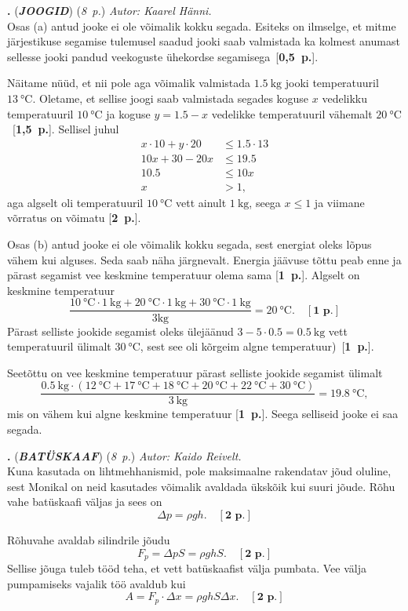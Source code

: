 \documentclass[12pt,a5paper]{article}
\newcommand{\numb}[1]{\textbf{\large #1}}
\newcommand{\nimi}[1]{(\textsl{\small #1})}
\newcommand{\punktid}[1]{(\emph{#1~p.})}
\newcounter{ylesanne}
\newcommand{\yl}[1]{\addtocounter{ylesanne}{1}\newpage\numb{\theylesanne.} \nimi{\textbf{#1}} \newblock{}}
\newcommand{\pp}[1]{[\textbf{#1~p.}]}
\newcommand{\autor}[1]{\emph{ Autor: #1.\\}}
\begin{document}
\yl{JOOGID}\punktid{8}\autor{Kaarel Hänni}
Osas (a) antud jooke ei ole võimalik kokku segada. Esiteks on ilmselge, et mitme järjestikuse segamise tulemusel saadud jooki saab valmistada ka kolmest anumast sellesse jooki pandud veekoguste ühekordse segamisega~\pp{0,5}.\par
Näitame nüüd, et nii pole aga võimalik valmistada $\SI{1.5}{\kilo\gram}$ jooki temperatuuril $\SI{13}{\celsius}$. Oletame, et sellise joogi saab valmistada segades koguse $x$ vedelikku temperatuuril $\SI{10}{\celsius}$ ja koguse $y=\num{1.5}-x$ vedelikke temperatuuril vähemalt $\SI{20}{\celsius}$~\pp{1,5}. Sellisel juhul
\begin{align*}
x\cdot 10+y\cdot 20 &\leq 1.5\cdot 13 \\
10x+30-20x &\leq 19.5 \\
10.5 &\leq 10 x \\
x &> 1,
\end{align*}
aga algselt oli temperatuuril $\SI{10}{\celsius}$ vett ainult $\SI{1}{\kilo\gram}$, seega $x\leq 1$ ja viimane võrratus on võimatu \pp2.

Osas (b) antud jooke ei ole võimalik kokku segada, sest energiat oleks lõpus vähem kui alguses. Seda saab näha järgnevalt. Energia jäävuse tõttu peab enne ja pärast segamist vee keskmine temperatuur olema sama \pp{1}. Algselt on keskmine temperatuur $$\frac{\SI{10}{\celsius} \cdot \SI{1}{\kg} +\SI{20}{\celsius} \cdot \SI{1}{\kg}+\SI{30}{\celsius} \cdot \SI{1}{\kg}}{3\text{kg}}=\SI{20}{\celsius}.  \quad \pp{1}$$
Pärast selliste jookide segamist oleks ülejäänud $3-5\cdot 0.5=\SI{0.5}{\kilo\gram}$ vett temperatuuril ülimalt $\SI{30}{\celsius}$, sest see oli kõrgeim algne temperatuur)~\pp{1}. \par
Seetõttu on vee keskmine temperatuur pärast selliste jookide segamist ülimalt
$$\frac{\SI{0.5}{\kg}\cdot(\SI{12}{\celsius} +\SI{17}{\celsius} +\SI{18}{\celsius}+\SI{20}{\celsius} +\SI{22}{\celsius}+\SI{30}{\celsius})}{\SI{3}{\kg}}=\SI{19.8}{\celsius},$$
mis on vähem kui algne keskmine temperatuur \pp1. Seega selliseid jooke ei saa segada.

\yl{BATÜSKAAF}\punktid{8}\autor{Kaido Reivelt}
Kuna kasutada on lihtmehhanismid, pole maksimaalne rakendatav jõud oluline, sest Monikal on neid kasutades võimalik avaldada ükskõik kui suuri jõude. Rõhu vahe batüskaafi väljas ja sees on
$$\Delta p=\rho gh. \quad \pp{2}$$

Rõhuvahe avaldab silindrile jõudu
$$F_p=\Delta p S = \rho gh S. \quad \pp{2}$$
Sellise jõuga tuleb tööd teha, et vett batüskaafist välja pumbata. Vee välja pumpamiseks vajalik töö avaldub kui
$$A=F_p\cdot \Delta x= \rho gh S \Delta x. \quad \pp{2}$$
\end{document}
